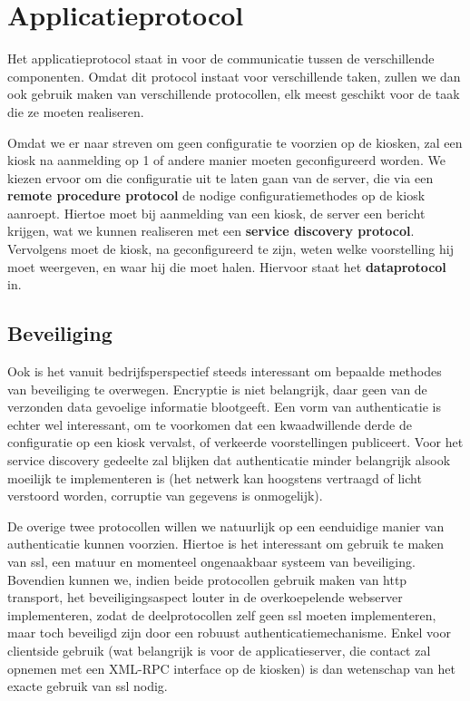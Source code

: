 \section{Applicatieprotocol}
\label{ontwerp:applicatie:applicatieprotocol}

Het applicatieprotocol staat in voor de communicatie tussen de verschillende componenten. Omdat dit protocol instaat voor verschillende taken, zullen we dan ook gebruik maken van verschillende protocollen, elk meest geschikt voor de taak die ze moeten realiseren.

Omdat we er naar streven om geen configuratie te voorzien op de kiosken, zal een kiosk na aanmelding op 1 of andere manier moeten geconfigureerd worden. We kiezen ervoor om die configuratie uit te laten gaan van de server, die via een \textbf{remote procedure protocol} de nodige configuratiemethodes op de kiosk aanroept. Hiertoe moet bij aanmelding van een kiosk, de server een bericht krijgen, wat we kunnen realiseren met een \textbf{service discovery protocol}. Vervolgens moet de kiosk, na geconfigureerd te zijn, weten welke voorstelling hij moet weergeven, en waar hij die moet halen. Hiervoor staat het \textbf{dataprotocol} in.

\subsection{Beveiliging}

Ook is het vanuit bedrijfsperspectief steeds interessant om bepaalde methodes van beveiliging te overwegen. Encryptie is niet belangrijk, daar geen van de verzonden data gevoelige informatie blootgeeft. Een vorm van authenticatie is echter wel interessant, om te voorkomen dat een kwaadwillende derde de configuratie op een kiosk vervalst, of verkeerde voorstellingen publiceert. Voor het service discovery gedeelte zal blijken dat authenticatie minder belangrijk alsook moeilijk te implementeren is (het netwerk kan hoogstens vertraagd of licht verstoord worden, corruptie van gegevens is onmogelijk).

De overige twee protocollen willen we natuurlijk op een eenduidige manier van authenticatie kunnen voorzien. Hiertoe is het interessant om gebruik te maken van \ac{ssl}, een matuur en momenteel ongenaakbaar systeem van beveiliging. Bovendien kunnen we, indien beide protocollen gebruik maken van \ac{http} transport, het beveiligingsaspect louter in de overkoepelende webserver implementeren, zodat de deelprotocollen zelf geen \ac{ssl} moeten implementeren, maar toch beveiligd zijn door een robuust authenticatiemechanisme. Enkel voor clientside gebruik (wat belangrijk is voor de applicatieserver, die contact zal opnemen met een XML-RPC interface op de kiosken) is dan wetenschap van het exacte gebruik van \ac{ssl} nodig.

